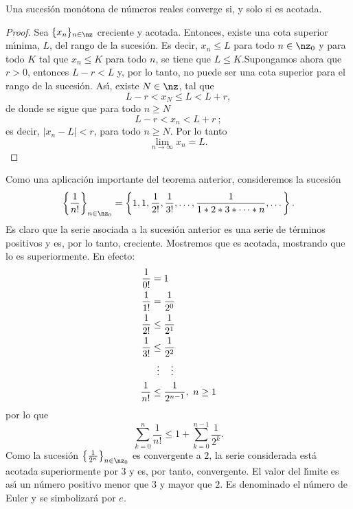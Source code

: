 \begin{theorem}
Una sucesi\'{o}n mon\'{o}tona%
de n\'{u}meros reales converge si, y solo si es acotada.
\end{theorem}

\begin{proof}
Sea $\{x_{n}\}_{n\in\nz}$ creciente y acotada. Entonces, existe una cota
superior m\'{\i}nima, $L$, del rango de la sucesi\'{o}n. Es decir, $x_{n}\leq
L$ para todo $n\in\nz_{0}$ y para todo $K$ tal que $x_{n}\leq K$ para todo
$n$, se tiene que $L\leq K$.\newline Supongamos ahora que $r>0$, entonces
$L-r<L$ y, por lo tanto, no puede ser una cota superior para el rango de la
sucesi\'{o}n. As\'{\i}, existe $N\in\nz$, tal que
\[
L-r<x_{N}\leq L<L+r,
\]
de donde se sigue que para todo $n\geq N$
\[
L-r<x_{n}<L+r\ ;
\]
es decir, $|x_{n}-L|<r$, para todo $n\geq N$. Por lo tanto
\[
\lim_{n\rightarrow\infty}x_{n}=L.
\]

\end{proof}

Como una aplicaci\'{o}n importante del teorema anterior, consideremos la
sucesi\'{o}n
\[
\left\{  \frac{1}{n!}\right\}  _{n\in\nz_{0}}=\left\{  1,1,\frac{1}{2!}%
,\frac{1}{3!},\dots,\frac{1}{1\ast2\ast3\ast\dots\ast n},\dots\right\}  .
\]
Es claro que la serie asociada a la sucesi\'{o}n anterior es una serie de
t\'{e}rminos positivos y es, por lo tanto, creciente. Mostremos que es
acotada, mostrando que lo es superiormente. En efecto:
\begin{align*}
\frac{1}{0!}  &  =1\\
\frac{1}{1!}  &  =\frac{1}{2^{0}}\\
\frac{1}{2!}  &  \leq\frac{1}{2^{1}}\\
\frac{1}{3!}  &  \leq\frac{1}{2^{2}}\\
&
\begin{tabular}
[c]{lll}%
$\vdots$ & $\vdots$ &
\end{tabular}
\\
\frac{1}{n!}  &  \leq\frac{1}{2^{n-1}},\ n\geq1
\end{align*}
por lo que
\[
\sum_{k=0}^{n}\frac{1}{n!}\leq1+\sum_{k=0}^{n-1}\frac{1}{2^{k}}.
\]
Como la sucesi\'{o}n $\left\{  \frac{1}{2^{n}}\right\}  _{n\in\nz_{0}}$ es
convergente a $2$, la serie considerada est\'{a} acotada superiormente por $3$
y es, por tanto, convergente. El valor del l\'{\i}mite es as\'{\i} un
n\'{u}mero positivo menor que $3$ y mayor que $2$. Es denominado el n\'{u}mero
de Euler y se simbolizar\'{a} por $e$.

